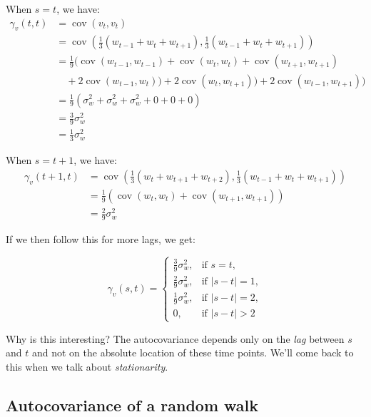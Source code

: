 \documentclass{article}
\begin{document}
When $s=t$, we have:
\begin{equation}
\begin{aligned}
\gamma_v(t,t) &= \operatorname{cov}(v_t, v_t) \\
&= \operatorname{cov}(\tfrac{1}{3}(w_{t-1}+w_t+w_{t+1}), \tfrac{1}{3}(w_{t-1}+w_t+w_{t+1})) \\
&= \tfrac{1}{9} (\operatorname{cov}(w_{t-1},w_{t-1}) + \operatorname{cov}(w_{t},w_{t}) + \operatorname{cov}(w_{t+1},w_{t+1}) \\
&\quad + 2\operatorname{cov}(w_{t-1}, w_t)) + 2\operatorname{cov}(w_{t}, w_{t+1})) + 2\operatorname{cov}(w_{t-1}, w_{t+1}))\\
&= \tfrac{1}{9} (\sigma_w^2 + \sigma_w^2 + \sigma_w^2 + 0 +0 +0)\\
&= \tfrac{3}{9} \sigma_w^2 \\
&= \tfrac{1}{3} \sigma_w^2
\end{aligned}
\end{equation}

When $s=t+1$, we have:
\begin{equation}
\begin{aligned}
\gamma_v(t+1,t) &= \operatorname{cov}(\tfrac{1}{3}(w_{t}+w_{t+1}+w_{t+2}), \tfrac{1}{3}(w_{t-1}+w_t+w_{t+1})) \\
&= \tfrac{1}{9}(\operatorname{cov}(w_t,w_t)+\operatorname{cov}(w_{t+1},w_{t+1}))\\
&= \tfrac{2}{9}\sigma^2_w
\end{aligned}
\end{equation}

If we then follow this for more lags, we get:

\begin{equation}
\gamma_v(s,t) = 
\begin{cases}
\tfrac{3}{9}\sigma^2_w, & \text{if } s=t, \\
\tfrac{2}{9}\sigma^2_w, & \text{if } |s-t|=1, \\
\tfrac{1}{9}\sigma^2_w, & \text{if } |s-t|=2, \\
0, & \text{if } |s-t|>2
\end{cases}
\end{equation}

Why is this interesting? The autocovariance depends only on the \textit{lag} between $s$ and $t$ and not on the absolute location of these time points. We'll come back to this when we talk about \textit{stationarity}.

\subsection{Autocovariance of a random walk}
\end{document}
